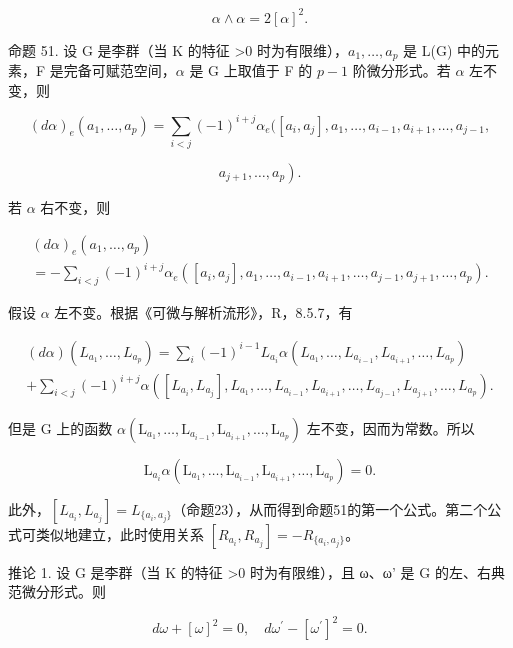 \[
\alpha \wedge \alpha = 2 [ \alpha ] ^ {2}.
\]

命题 51. 设 G 是李群（当 K 的特征 \textgreater0 时为有限维），\(a_{1},\ldots,a_{p}\) 是 L(G) 中的元素，F 是完备可赋范空间，\(\alpha\) 是 G 上取值于 F 的 \(p-1\) 阶微分形式。若 \(\alpha\) 左不变，则

\[
(d \alpha) _ {e} (a _ {1}, \dots , a _ {p}) = \sum_ {i <   j} (- 1) ^ {i + j} \alpha_ {e} ([ a _ {i}, a _ {j} ], a _ {1}, \dots , a _ {i - 1}, a _ {i + 1}, \dots , a _ {j - 1},
\]

\[
\left. a _ {j + 1}, \dots , a _ {p}\right).
\]

若 \(\alpha\) 右不变，则

\[
\begin{array}{l} (d \alpha) _ {e} (a _ {1}, \dots , a _ {p}) \\ = - \sum_ {i <   j} (- 1) ^ {i + j} \alpha_ {e} ([ a _ {i}, a _ {j} ], a _ {1}, \dots , a _ {i - 1}, a _ {i + 1}, \dots , a _ {j - 1}, a _ {j + 1}, \dots , a _ {p}). \end{array}
\]

假设 \(\alpha\) 左不变。根据《可微与解析流形》，R，8.5.7，有

\[
\begin{array}{l} (d \alpha) (L _ {a _ {1}}, \ldots , L _ {a _ {p}}) = \sum_ {i} (- 1) ^ {i - 1} L _ {a _ {i}} \alpha (L _ {a _ {1}}, \ldots , L _ {a _ {i - 1}}, L _ {a _ {i + 1}}, \ldots , L _ {a _ {p}}) \\ + \sum_ {i <   j} (- 1) ^ {i + j} \alpha ([ L _ {a _ {i}}, L _ {a _ {j}} ], L _ {a _ {1}}, \ldots , L _ {a _ {i - 1}}, L _ {a _ {i + 1}}, \ldots , L _ {a _ {j - 1}}, L _ {a _ {j + 1}}, \ldots , L _ {a _ {p}}). \end{array}
\]

但是 G 上的函数 \(\alpha (\mathrm{L}_{a_1},\dots ,\mathrm{L}_{a_{i - 1}},\mathrm{L}_{a_{i + 1}},\dots ,\mathrm{L}_{a_p})\) 左不变，因而为常数。所以

\[
\mathrm{L} _ {a _ {i}} \alpha (\mathrm{L} _ {a _ {1}}, \dots , \mathrm{L} _ {a _ {i - 1}}, \mathrm{L} _ {a _ {i + 1}}, \dots , \mathrm{L} _ {a _ {p}}) = 0.
\]

此外，\([L_{a_{i}}, L_{a_{j}}] = L_{\{a_{i}, a_{j}\}}\)（命题23），从而得到命题51的第一个公式。第二个公式可类似地建立，此时使用关系 \([R_{a_{i}}, R_{a_{j}}] = -R_{\{a_{i}, a_{j}\}}\)。

推论 1. 设 G 是李群（当 K 的特征 \textgreater0 时为有限维），且 ω、ω' 是 G 的左、右典范微分形式。则

\[
d \omega + [ \omega ] ^ {2} = 0, \quad d \omega^ {\prime} - [ \omega^ {\prime} ] ^ {2} = 0.
\]

